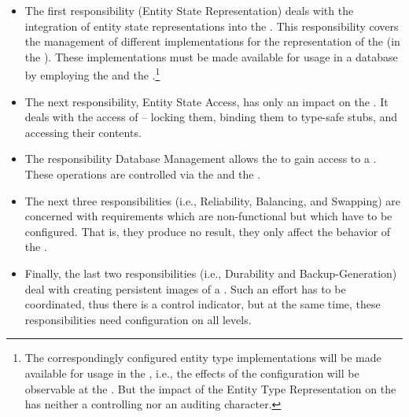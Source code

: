 \documentclass[a4paper, 12pt]{book}
\begin{document}
\begin{itemize}
\item The first responsibility (Entity State Representation)
  deals with the integration of entity state representations into the
  \SYNEIGHT. This responsibility covers the management of
  different implementations for the representation of the  (in the \PMI). These implementations must be made available
  for usage in a database by employing the \DBMI and the
  \LDBMI.\footnote{The correspondingly configured entity type
  implementations will be made available for usage in the \DBAI, i.e.,
  the effects of the configuration will be observable at the
  \DBAI. But the impact of the Entity Type Representation on the
  \DBAI has neither a controlling nor an auditing character.}
\item The next responsibility, Entity State Access,  has only an impact on the \DBAI. It
  deals with the access of  -- locking them, binding them to
  type-safe stubs, and accessing their contents. 
\item The responsibility Database Management allows the  to gain
  access to a . These operations are controlled via the
  \LDBMI and the \DBMI.
\item The next three responsibilities (i.e., Reliability, Balancing,
  and Swapping) are concerned with requirements which
  are non-functional but which have to be configured. That is, they produce no
  result, they only affect the behavior of the \SYNEIGHT.
\item Finally, the last two responsibilities (i.e., Durability and
Backup-Generation) deal with creating persistent images of a
. Such an effort has to be coordinated, thus there is a
control indicator, but at the same time, these responsibilities need
configuration on all levels.
\end{itemize}

\end{document}
